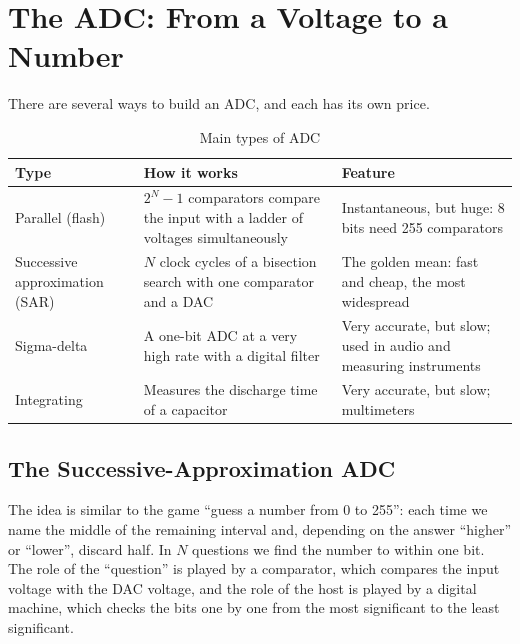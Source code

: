 \section{The ADC: From a Voltage to a Number}

There are several ways to build an ADC, and each has its own price.

\begin{table}[H]
\centering
\caption{Main types of ADC}
\small
\begin{tabularx}{\textwidth}{l X X}
\toprule
\textbf{Type} & \textbf{How it works} & \textbf{Feature} \\
\midrule
Parallel (flash) & $2^N-1$ comparators compare the input with a ladder of voltages simultaneously & Instantaneous, but huge: 8 bits need 255 comparators \\
Successive approximation (SAR) & $N$ clock cycles of a bisection search with one comparator and a DAC & The golden mean: fast and cheap, the most widespread \\
Sigma-delta & A one-bit ADC at a very high rate with a digital filter & Very accurate, but slow; used in audio and measuring instruments \\
Integrating & Measures the discharge time of a capacitor & Very accurate, but slow; multimeters \\
\bottomrule
\end{tabularx}
\end{table}

\subsection{The Successive-Approximation ADC}

The idea is similar to the game ``guess a number from 0 to 255'': each time we name the middle of
the remaining interval and, depending on the answer ``higher'' or ``lower'', discard half.
In $N$ questions we find the number to within one bit. The role of the
``question'' is played by a comparator, which compares the input voltage with the
DAC voltage, and the role of the host is played by a digital machine, which checks the bits one by one
from the most significant to the least significant.

